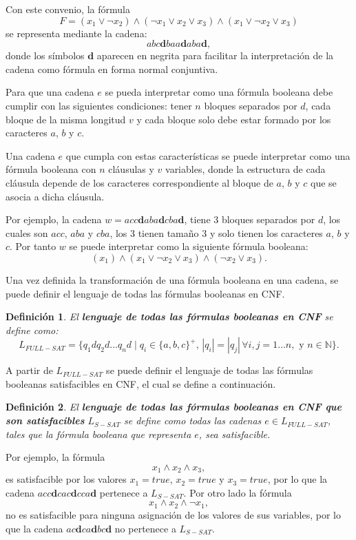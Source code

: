 \documentclass[12pt]{article}
\newtheorem{definition}{Definición}
\begin{document}
Con este convenio, la fórmula
$$ F=(x_1 \vee \neg x_2) \wedge (\neg x_1 \vee x_2 \vee x_3) \wedge (x_1 \vee \neg x_2 \vee x_3)$$
se representa mediante la cadena:
$$abc\mathbf{d}baa\mathbf{d}aba\mathbf{d},$$
donde los símbolos $\mathbf{d}$ aparecen en negrita para facilitar la interpretación de la cadena como fórmula 
en forma normal conjuntiva.

Para que una cadena $e$ se pueda interpretar como una fórmula booleana debe cumplir con las siguientes condiciones:
tener $n$ bloques separados por $d$, cada bloque de la misma longitud $v$ y cada bloque solo debe estar formado por los caracteres
$a$, $b$ y $c$. 

Una cadena $e$ que cumpla con estas características  se puede interpretar como una fórmula booleana con $n$ cláusulas y $v$ variables, donde la estructura de cada cláusula depende de los caracteres correspondiente al bloque de $a$, $b$ y $c$ que se asocia a dicha cláusula.

Por ejemplo, la cadena $w=acc\mathbf{d}aba\mathbf{d}cba\mathbf{d}$, tiene 3 bloques separados por $d$, los cuales son $acc$, $aba$ y $cba$, los 3 tienen tamaño 3 y solo tienen los caracteres $a$, $b$ y $c$.
Por tanto  $w$ se puede interpretar como la siguiente fórmula booleana:
$$(x_1)\wedge(x_1\vee \neg x_2 \vee x_3) \wedge (\neg x_2\vee x_3).$$

Una vez definida la transformación de una fórmula booleana en una cadena, se puede definir el lenguaje de todas las fórmulas booleanas en CNF.

\begin{definition}
    El \textbf{lenguaje de todas las fórmulas booleanas en CNF} se define como:
    \[
        L_{FULL-SAT} = \{ q_1dq_2d\dots q_nd \mid q_i \in \{a, b,c\}^+\text{, }
        |q_i| = |q_j| \, \forall i, j =1\dots n, \text{ y } n\in \mathbb{N}\}.
    \]
\end{definition}

A partir de $L_{FULL-SAT}$ se puede definir el lenguaje de todas las fórmulas booleanas satisfacibles
en CNF, el cual se define a continuación.

\begin{definition}
    El \textbf{lenguaje de todas las fórmulas booleanas en CNF que son satisfacibles} $L_{S-SAT}$ se define como todas las cadenas $e\in L_{FULL-SAT}$,
    tales que la fórmula booleana que representa $e$, sea satisfacible.
\end{definition}

Por ejemplo, la fórmula $$x_1\wedge x_2 \wedge x_3,$$ es satisfacible por los valores $x_1=true$, $x_2=true$ y $x_3=true$, por lo que la 
cadena $acc\mathbf{d}cac\mathbf{d}cca\mathbf{d}$ pertenece a $L_{S-SAT}$. Por otro lado la fórmula $$x_1\wedge x_2 \wedge \neg x_1,$$
no es satisfacible para ninguna asignación de los valores de sus variables, por lo que la cadena $ac\mathbf{d}ca\mathbf{d}bc\mathbf{d}$
no pertenece a $L_{S-SAT}$.
\end{document}
